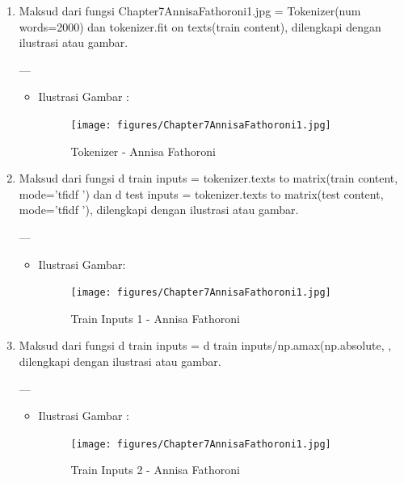 {\begin{enumerate}
\begin{itemize}
\end{itemize}

\item Maksud dari fungsi Chapter7AnnisaFathoroni1.jpg = Tokenizer(num words=2000) dan tokenizer.fit on texts(train content), dilengkapi dengan ilustrasi atau gambar.

---

\begin{itemize}
\item Ilustrasi Gambar :

\begin{figure}[!hbtp]
\centering
\texttt{[image: figures/Chapter7AnnisaFathoroni1.jpg]}
\caption{Tokenizer - Annisa Fathoroni}
\label{Tokenizer - Annisa Fathoroni}
\end{figure}

\end{itemize}

\item Maksud dari fungsi d train inputs = tokenizer.texts to matrix(train content, mode=’tfidf ’) dan d test inputs = tokenizer.texts to matrix(test content, mode=’tfidf ’), dilengkapi dengan ilustrasi atau gambar.

---

\begin{itemize}
\item Ilustrasi Gambar:

\begin{figure}[!hbtp]
\centering
\texttt{[image: figures/Chapter7AnnisaFathoroni1.jpg]}
\caption{Train Inputs 1 - Annisa Fathoroni}
\label{Train Inputs 1 - Annisa Fathoroni}
\end{figure}

\end{itemize}

\item Maksud dari fungsi d train inputs = d train inputs/np.amax(np.absolute, , dilengkapi dengan ilustrasi atau gambar.

---

\begin{itemize}
\item Ilustrasi Gambar :

\begin{figure}[!hbtp]
\centering
\texttt{[image: figures/Chapter7AnnisaFathoroni1.jpg]}
\caption{Train Inputs 2 - Annisa Fathoroni}
\label{Train Inputs 2 - Annisa Fathoroni}
\end{figure}

\end{itemize}


\end{enumerate}}
